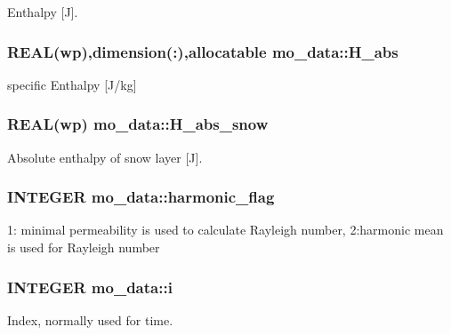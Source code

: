 Enthalpy \mbox{[}J\mbox{]}. 

\hypertarget{namespacemo__data_a763929f604ab797932f22f50a720a1a1}{
\subsubsection[{H\_\-abs}]{\setlength{\rightskip}{0pt plus 5cm}REAL(wp),dimension(:),allocatable {\bf mo\_\-data::H\_\-abs}}}
\label{namespacemo__data_a763929f604ab797932f22f50a720a1a1}


specific Enthalpy \mbox{[}J/kg\mbox{]} 

\hypertarget{namespacemo__data_a01f72ce0ba7168d410a2a683c2579e2d}{
\subsubsection[{H\_\-abs\_\-snow}]{\setlength{\rightskip}{0pt plus 5cm}REAL(wp) {\bf mo\_\-data::H\_\-abs\_\-snow}}}
\label{namespacemo__data_a01f72ce0ba7168d410a2a683c2579e2d}


Absolute enthalpy of snow layer \mbox{[}J\mbox{]}. 

\hypertarget{namespacemo__data_a95ab71baf4d9fbae790e31780317af06}{
\subsubsection[{harmonic\_\-flag}]{\setlength{\rightskip}{0pt plus 5cm}INTEGER {\bf mo\_\-data::harmonic\_\-flag}}}
\label{namespacemo__data_a95ab71baf4d9fbae790e31780317af06}


1: minimal permeability is used to calculate Rayleigh number, 2:harmonic mean is used for Rayleigh number 

\hypertarget{namespacemo__data_ad15359b125bff66cb0f739e0eb5b01d4}{
\subsubsection[{i}]{\setlength{\rightskip}{0pt plus 5cm}INTEGER {\bf mo\_\-data::i}}}
\label{namespacemo__data_ad15359b125bff66cb0f739e0eb5b01d4}


Index, normally used for time. 

